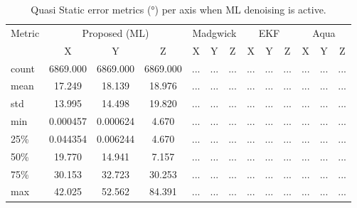\documentclass{iutbscthesis}
\begin{document}
\begin{table}[ht]
\centering
\caption{Quasi Static error metrics (°) per axis when ML denoising is active.}
\label{tab:quasi_ml}
\begin{tabular}{l
  *{4}{ccc}
}
\toprule
Metric & \multicolumn{3}{c}{Proposed (ML)} & \multicolumn{3}{c}{Madgwick} & \multicolumn{3}{c}{EKF} & \multicolumn{3}{c}{Aqua} \\
 & X & Y & Z & X & Y & Z & X & Y & Z & X & Y & Z \\
\midrule
count & 6869.000 & 6869.000 & 6869.000 & ... & ... & ... & ... & ... & ... & ... & ... & ... \\
mean & 17.249 & 18.139 & 18.976 & ... & ... & ... & ... & ... & ... & ... & ... & ... \\
std & 13.995 & 14.498 & 19.820 & ... & ... & ... & ... & ... & ... & ... & ... & ... \\
min & 0.000457 & 0.000624 & 4.670 & ... & ... & ... & ... & ... & ... & ... & ... & ... \\
25\% & 0.044354 & 0.006244 & 4.670 & ... & ... & ... & ... & ... & ... & ... & ... & ... \\
50\% & 19.770 & 14.941 & 7.157 & ... & ... & ... & ... & ... & ... & ... & ... & ... \\
75\% & 30.153 & 32.723 & 30.253 & ... & ... & ... & ... & ... & ... & ... & ... & ... \\
max & 42.025 & 52.562 & 84.391 & ... & ... & ... & ... & ... & ... & ... & ... & ... \\
\bottomrule
\end{tabular}
\end{table}
\end{document}
